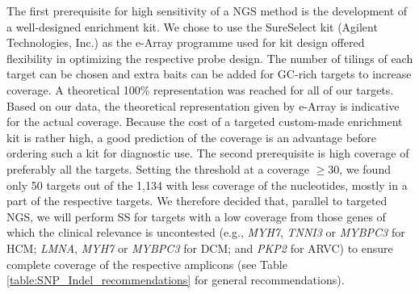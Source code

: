 The first prerequisite for high sensitivity of a NGS method is the development of a well-designed enrichment kit. 
We chose to use the SureSelect kit (Agilent Technologies, Inc.) as the e-Array programme used for kit design offered flexibility in optimizing the respective probe design. 
The number of tilings of each target can be chosen and extra baits can be added for GC-rich targets to increase coverage. 
A theoretical 100\% representation was reached for all of our targets. 
Based on our data, the theoretical representation given by e-Array is indicative for the actual coverage. 
Because the cost of a targeted custom-made enrichment kit is rather high, a good prediction of the coverage is an advantage before ordering such a kit for diagnostic use. 
The second prerequisite is high coverage of preferably all the targets. 
Setting the threshold at a coverage $\ge$30, we found only 50 targets out of the 1,134 with less coverage of the nucleotides, mostly in a part of the respective targets. 
We therefore decided that, parallel to targeted NGS, we will perform SS for targets with a low coverage from those genes of which the clinical relevance is uncontested (e.g., \textsl{MYH7}, \textsl{TNNI3} or \textsl{MYBPC3} for HCM; \textsl{LMNA}, \textsl{MYH7} or \textsl{MYBPC3} for DCM; and \textsl{PKP2} for ARVC) to ensure complete coverage of the respective amplicons (see Table \ref{table:SNP_Indel_recommendations} for general recommendations). 

